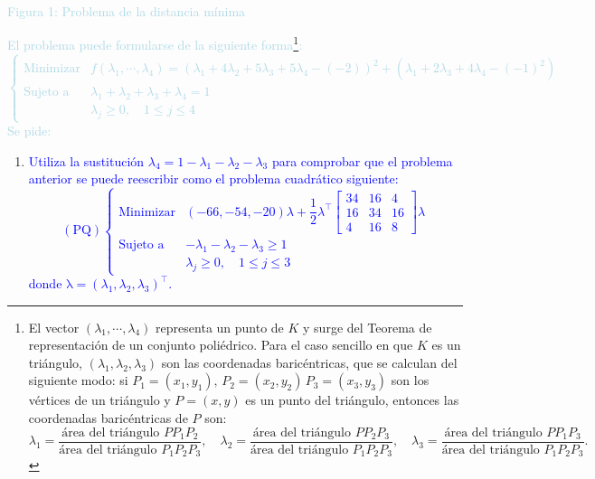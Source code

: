 \documentclass[12pt]{article}
\newcommand{\lb}[1]{\textcolor{lightblue}{#1}}
\newcommand{\db}[1]{\textcolor{blue}{#1}}
\begin{document}
\begin{enumerate}[label=\color{red}\arabic*.]
\begin{center}
    
    \lb{Figura 1: Problema de la distancia mínima}
    \end{center}
    \lb{El problema puede formularse de la siguiente forma\footnote{El vector $(\lambda_1,\cdots,\lambda_4)$ representa un punto de $K$ y surge del Teorema de representación de un conjunto poliédrico. Para el caso sencillo en que $K$ es un triángulo, $(\lambda_1,\lambda_2,\lambda_3)$ son las coordenadas baricéntricas, que se calculan del siguiente modo: si $P_1=(x_1,y_1),\, P_2=(x_2,y_2)\, P_3=(x_3,y_3)$ son los vértices de un triángulo y $P=(x,y)$ es un punto del triángulo, entonces las coordenadas baricéntricas de $P$ son: \[ \lambda_1=\dfrac{\text{área del triángulo }PP_1P_2}{\text{área del triángulo }P_1P_2P_3},\quad\lambda_2=\dfrac{\text{área del triángulo }PP_2P_3}{\text{área del triángulo } P_1P_2P_3},\quad\lambda_3=\dfrac{\text{área del triángulo }PP_1P_3}{\text{área del triángulo }P_1P_2P_3}. \]}: \[ \begin{cases}
    \text{Minimizar} & f(\lambda_1,\cdots,\lambda_4)=(\lambda_1+4\lambda_2+5\lambda_3+5\lambda_4-(-2))^2+(\lambda_1+2\lambda_3+4\lambda_4-(-1)^2)\\
    \text{Sujeto a} & \lambda_1+\lambda_2+\lambda_3+\lambda_4=1\\
     & \lambda_j\ge0,\quad 1\le j\le 4
    \end{cases} \]Se pide:}
    \begin{enumerate}[label=\color{red}\alph*)]
    	\item \db{Utiliza la sustitución $\lambda_4=1-\lambda_1-\lambda_2-\lambda_3$ para comprobar que el problema anterior se puede reescribir como el problema cuadrático siguiente:  \begin{equation}
    	(\mathrm{PQ})\begin{cases}
    	\text{Minimizar} & (-66,-54,-20)\lambda+\dfrac{1}{2}\lambda^\intercal\begin{bmatrix}
    	34 & 16 & 4 \\
    	16 & 34 & 16 \\
    	4 & 16 & 8
    	\end{bmatrix}\lambda\\
    	\text{Sujeto a} & -\lambda_1-\lambda_2-\lambda_3\ge1\\
    	 &\lambda_j\ge0,\quad 1\le j\le 3
    	\end{cases}
    	\end{equation} donde $\mathrm{\lambda}=(\lambda_1,\lambda_2,\lambda_3)^\intercal$.}
    	

\end{enumerate}
\end{enumerate}
\end{document}
